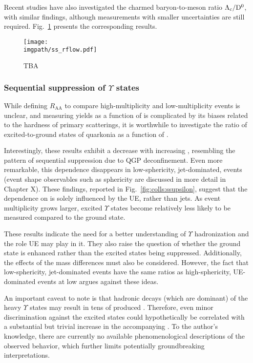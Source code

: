 Recent studies have also investigated the charmed baryon-to-meson ratio $\Lambda_c/\mathrm{D^0}$, with similar findings, although measurements with smaller uncertainties are still required. Fig.~\ref{fig:colls:ssrflow} presents the corresponding results.

\begin{figure}[H]
\texttt{[image: \\imgpath/ss\_rflow.pdf]}
\caption{TBA}
\label{fig:colls:ssrflow}
\end{figure}

\subsubsection{Sequential suppression of $\Upsilon$ states}

While defining $R_\mathrm{AA}$ to compare high-multiplicity and low-multiplicity events is unclear, and measuring yields as a function of \Nch is complicated by its biases related to the hardness of primary scatterings, it is worthwhile to investigate the ratio of excited-to-ground states of quarkonia as a function of \Nch.

Interestingly, these results exhibit a decrease with increasing \Nch, resembling the pattern of sequential suppression due to QGP deconfinement. Even more remarkable, this dependence disappears in low-sphericity, jet-dominated, events (event shape observables such as sphericity are discussed in more detail in Chapter X). These findings, reported in Fig.~\ref{fig:colls:ssupsilon}, suggest that the dependence on \Nch is solely influenced by the UE, rather than jets. As event multiplicity grows larger, excited $\Upsilon$ states become relatively less likely to be measured compared to the ground state.

These results indicate the need for a better understanding of $\Upsilon$ hadronization and the role UE may play in it. They also raise the question of whether the ground state is enhanced rather than the excited states being suppressed. Additionally, the effects of the mass differences must also be considered. However, the fact that low-sphericity, jet-dominated events have the same ratios as high-sphericity, UE-dominated events at low \Nch argues against these ideas.

An important caveat to note is that hadronic decays (which are dominant) of the heavy $\Upsilon$ states may result in tens of produced \Nch. Therefore, even minor discrimination against the excited states could hypothetically be correlated with a substantial but trivial increase in the accompanying \Nch. To the author's knowledge, there are currently no available phenomenological descriptions of the observed behavior, which further limits potentially groundbreaking interpretations.

